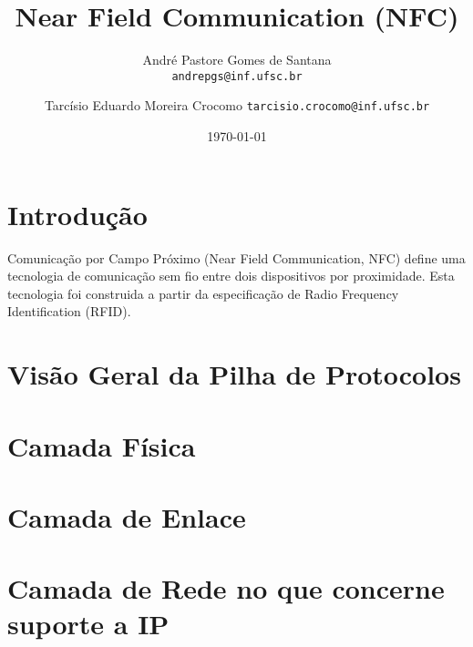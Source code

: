 \documentclass[a4paper,oneside]{article}
\title{Near Field Communication (NFC)}
\author{
    André Pastore Gomes de Santana\\
    \texttt{andrepgs@inf.ufsc.br}
    \and
    Tarcísio Eduardo Moreira Crocomo
    \texttt{tarcisio.crocomo@inf.ufsc.br}
}
\date{\today}
\begin{document}
\maketitle


\section{Introdução}
Comunicação por Campo Próximo (Near Field Communication, NFC) define uma tecnologia de comunicação sem fio entre dois dispositivos por proximidade. Esta tecnologia foi construida a partir da especificação de Radio Frequency Identification (RFID)\cite{iso14443-2}.

\section{Visão Geral da Pilha de Protocolos}
\section{Camada Física}


\section{Camada de Enlace}
\section{Camada de Rede no que concerne suporte a IP}






\end{document}
